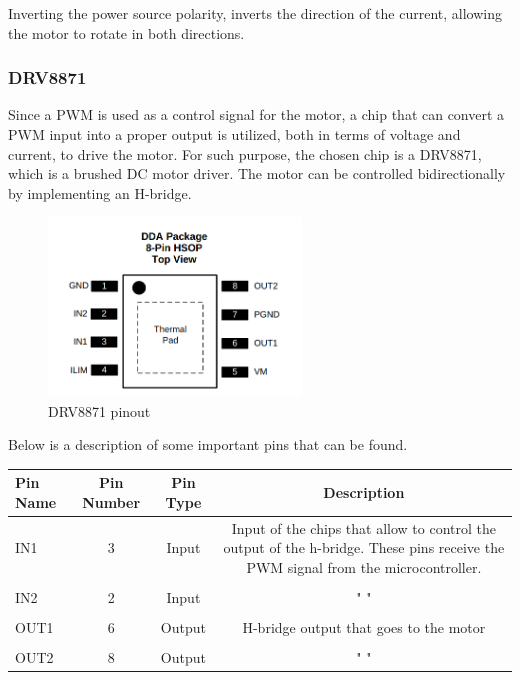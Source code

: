 \documentclass[english]{article}
\begin{document}
Inverting the power source polarity, inverts the direction of the current, allowing 
the motor to rotate in both directions. 
\subsubsection{DRV8871}
Since a PWM is used as a control signal for the motor, a chip that can 
convert a PWM input into a proper output is utilized, both in terms of 
voltage and current, to drive the motor. For such purpose, the chosen chip is a DRV8871,
which is a brushed DC motor driver. 
The motor can be controlled bidirectionally by implementing an H-bridge. 
\begin{figure}[!h]
    \centering
    \includegraphics[width=0.60\textwidth, height=0.30\textheight]{figures/DRV.png}
    \caption{DRV8871 pinout}
    \label{fig:drv}
\end{figure}
\newpage
Below is a description of some important pins that can be found. \newline
\begin{center}    
    \begin{tabular}{lS[table-format=3]cS[table-format=2.2]}
        \toprule
        \textbf{Pin Name} & \textbf{Pin Number} & \textbf{Pin Type} & \textbf{Description} \\
        \midrule
        IN1 & 3 & Input & \parbox{5cm}{Input of the chips that allow to control the output of the h-bridge. These pins receive the PWM signal from the microcontroller.}  \\ \\
        IN2 & 2 & Input & " "\\ \\
        OUT1 & 6 & Output & \parbox{5cm}{H-bridge output that goes to the motor}  \\ \\
        OUT2 & 8 & Output & " " \\
        \bottomrule
    \end{tabular}
\end{center}
\end{document}
